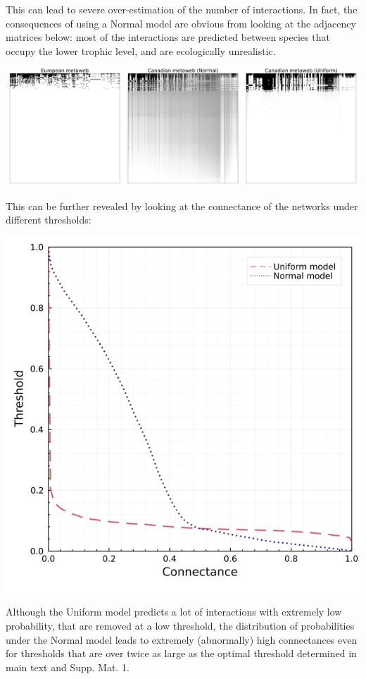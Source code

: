 This can lead to severe over-estimation of the number of interactions.
In fact, the consequences of using a Normal model are obvious from
looking at the adjacency matrices below: most of the interactions are
predicted between species that occupy the lower trophic level, and are
ecologically unrealistic.

\includegraphics[width=\textwidth]{./figures/adjacencymatrices.png}

This can be further revealed by looking at the connectance of the
networks under different thresholds:

\includegraphics[width=\textwidth]{./figures/supplementary/comparison_connectance.png}

Although the Uniform model predicts a lot of interactions with extremely
low probability, that are removed at a low threshold, the distribution
of probabilities under the Normal model leads to extremely (abnormally)
high connectances even for thresholds that are over twice as large as
the optimal threshold determined in main text and Supp. Mat. 1.

